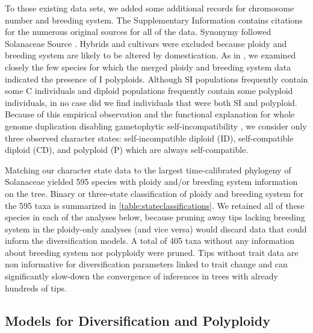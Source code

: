 To those existing data sets, we added some additional records for chromosome number and breeding system.
The Supplementary Information contains citations for the numerous original sources for all of the data. %
Synonymy followed Solanaceae Source \citep{solsource}.
Hybrids and cultivars were excluded because ploidy and breeding system are likely to be altered by domestication.
As in \citet{robertson_2011}, we examined closely the few species for which the merged ploidy and breeding system data indicated the presence of I polyploids.
Although SI populations frequently contain some C individuals and diploid populations frequently contain some polyploid individuals, in no case did we find individuals that were both SI and polyploid.
Because of this empirical observation and the functional explanation for whole genome duplication disabling gametophytic self-incompatibility \citep[reviewed in][]{ramsey_1998,stone_2002}, we consider only three observed character states: self-incompatible diploid (ID), self-compatible diploid (CD), and polyploid (P) which are always self-compatible.


Matching our character state data to the largest time-calibrated phylogeny of Solanaceae \citep{sarkinen_2013} yielded 595 species with ploidy and/or breeding system information on the tree.
Binary or three-state classification of ploidy and breeding system for the 595 taxa is summarized in \cref{table:stateclassifications}. %
We retained all of these species in each of the analyses below, because pruning away tips lacking breeding system in the ploidy-only analyses (and vice versa) would discard data that could inform the diversification models. A total of 405 taxa without any information about breeding system nor polyploidy were pruned. Tips without trait data are non informative for  diversification parameters linked to trait change and can significantly slow-down the convergence of inferences in trees with already hundreds of tips.%

\subsection{Models for Diversification and Polyploidy}

